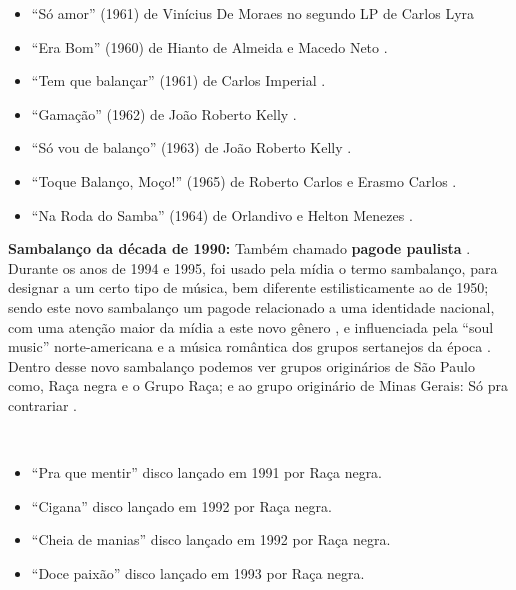 \begin{description}
\begin{example}
\begin{itemize}
\item ``Só amor'' (1961) de Vinícius De Moraes no segundo LP de Carlos Lyra \cite[pp. 142]{lyrasongbook}  
\item ``Era Bom'' (1960) de Hianto de Almeida e Macedo Neto  \cite[pp. 123]{de2003tem}.
\item ``Tem que balançar'' (1961) de Carlos Imperial  \cite{de2017sambalanco}.
\item ``Gamação'' (1962) de João Roberto Kelly \cite[pp. 122]{de2003tem}.
\item ``Só vou de balanço'' (1963) de João Roberto Kelly \cite{de2017sambalanco}.
\item ``Toque Balanço, Moço!'' (1965) de Roberto Carlos e Erasmo Carlos \cite{de2017sambalanco} \cite[pp. 123]{de2003tem}.
\item ``Na Roda do Samba'' (1964) de Orlandivo e Helton Menezes \cite{de2017sambalanco} \cite[pp. 122]{de2003tem}.
\end{itemize}
\end{example}

\textbf{Sambalanço da década de 1990:} Também chamado \textbf{pagode paulista}  \cite[pp. 130]{perna2002samba}.
Durante os anos de 1994 e 1995, 
foi usado pela mídia o termo sambalanço, para designar a um certo tipo de música, 
bem diferente estilisticamente ao de 1950;
sendo este novo sambalanço um pagode relacionado a uma identidade nacional,
com uma atenção maior da mídia a este novo gênero \cite[pp. 127]{vianna1999bezerra}, 
e influenciada pela ``soul music'' norte-americana e a música romântica dos grupos sertanejos da época  \cite[pp. 130-131]{perna2002samba}.
Dentro desse novo sambalanço podemos ver grupos originários de São Paulo como, Raça negra e o Grupo Raça;
e ao grupo originário de Minas Gerais: Só pra contrariar \cite[pp. 130]{perna2002samba} \cite[pp. 128]{vianna1999bezerra}.

\begin{example} ~

\begin{itemize}
\item ``Pra que mentir'' disco lançado em 1991 por Raça negra.
\item ``Cigana'' disco lançado em 1992 por Raça negra.
\item ``Cheia de manias'' disco lançado em 1992 por Raça negra.
\item ``Doce paixão'' disco lançado em 1993 por Raça negra.
\end{itemize}
\end{example}


\end{description}
